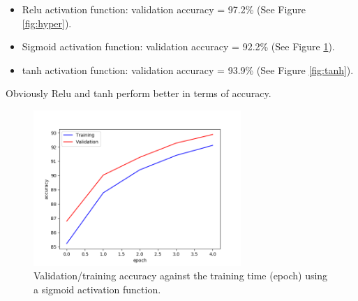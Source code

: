 \documentclass[a4paper]{article}
\begin{document}
\begin{enumerate}
\begin{itemize}

\item Relu activation function: validation accuracy = 97.2\% (See Figure \ref{fig:hyper}).

\item Sigmoid activation function: validation accuracy = 92.2\% (See Figure \ref{fig:sigmoid}).

\item tanh activation function: validation accuracy = 93.9\% (See Figure \ref{fig:tanh}).  
  
\end{itemize}
Obviously Relu and tanh perform better in terms of accuracy. 
\begin{figure}
\centering
\includegraphics[width=0.7\textwidth]{epoch2.png}
\caption{\label{fig:sigmoid}Validation/training accuracy against the training time (epoch) using a sigmoid activation function.}
\end{figure}


\end{enumerate}
\end{document}
